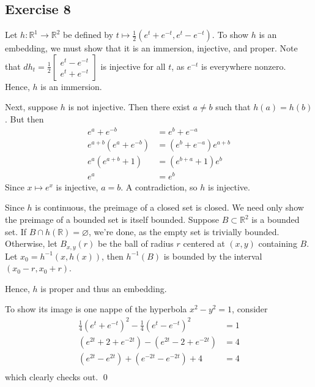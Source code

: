 \documentclass{article}
\newcommand{\R}{\mathbb{R}}
\begin{document}
\subsection*{Exercise 8}
  Let $h\colon\R^1\to\R^2$ be defined by $t\mapsto\frac{1}{2}(e^t+e^{-t},e^t-
  e^{-t})$. To show $h$ is an embedding, we must show that it is an immersion,
  injective, and proper. Note that $dh_t=\frac{1}{2}
  \left[
    \begin{smallmatrix}
      e^t-e^{-t}\\
      e^t+e^{-t}
    \end{smallmatrix}
  \right]$ is injective for all $t$, as $e^{-t}$ is everywhere nonzero. Hence,
  $h$ is an immersion.

  Next, suppose $h$ is not injective. Then there exist $a\ne b$ such that $h(a)=
  h(b)$. But then
  \begin{align*}
    e^a+e^{-b}          &= e^b+e^{-a}           \\
    e^{a+b}(e^a+e^{-b}) &= (e^b+e^{-a})e^{a+b}  \\
    e^a(e^{a+b}+1)      &= (e^{b+a}+1)e^b       \\
    e^a                 &= e^b
  \end{align*}
  Since $x\mapsto e^x$ is injective, $a=b$. A contradiction, so $h$ is
  injective.

  Since $h$ is continuous, the preimage of a closed set is closed. We need only
  show the preimage of a bounded set is itself bounded. Suppose $B\subset\R^2$
  is a bounded set. If $B\cap h(\R)=\varnothing$, we're done, as the empty set
  is trivially bounded. Otherwise, let $B_{x,y}(r)$ be the ball of radius $r$
  centered at $(x,y)$ containing $B$. Let $x_0 = h^{-1}(x, h(x))$, then $h^{-1}
  (B)$ is bounded by the interval $(x_0-r,x_0+r)$.

  Hence, $h$ is proper and thus an embedding.

  To show its image is one nappe of the hyperbola $x^2-y^2=1$, consider
  \begin{align*}
    \frac{1}{4}(e^t+e^{-t})^2-\frac{1}{4}(e^t-e^{-t})^2 &= 1\\
    (e^{2t}+2+e^{-2t})-(e^{2t}-2+e^{-2t})               &= 4\\
    (e^{2t}-e^{2t})+(e^{-2t}-e^{-2t})+4                 &= 4\\
  \end{align*}
  which clearly checks out.
  \qed
\end{document}
